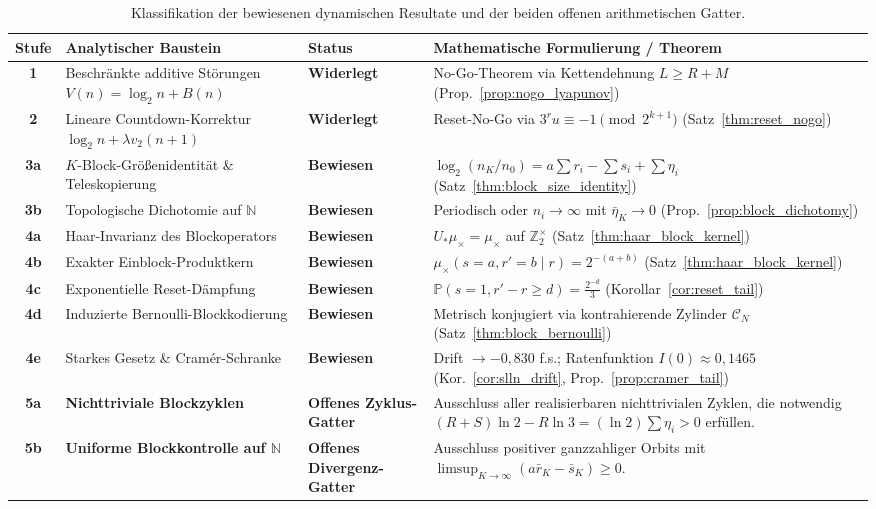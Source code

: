 \documentclass[11pt,reqno]{amsart}
\theoremstyle{definition}
\theoremstyle{remark}
\numberwithin{equation}{section}
\begin{document}
\begin{table}[!ht]
\centering
\small
\renewcommand{\arraystretch}{1.3}
\begin{tabular}{clll}
\toprule
\textbf{Stufe} & \textbf{Analytischer Baustein} & \textbf{Status} & \textbf{Mathematische Formulierung / Theorem} \\
\midrule
\textbf{1} & Beschr\"ankte additive St\"orungen $V(n) = \log_2 n + B(n)$ & \textbf{Widerlegt} & No-Go-Theorem via Kettendehnung $L \ge R+M$ (Prop.~\ref{prop:nogo_lyapunov}) \\
\textbf{2} & Lineare Countdown-Korrektur $\log_2 n + \lambda v_2(n+1)$ & \textbf{Widerlegt} & Reset-No-Go via $3^r u \equiv -1 \pmod{2^{k+1}}$ (Satz~\ref{thm:reset_nogo}) \\
\midrule
\textbf{3a} & $K$-Block-Gr\"o\ss{}enidentit\"at \& Teleskopierung & \textbf{Bewiesen} & $\log_2(n_K/n_0) = a \sum r_i - \sum s_i + \sum \eta_i$ (Satz~\ref{thm:block_size_identity}) \\
\textbf{3b} & Topologische Dichotomie auf $\mathbb{N}$ & \textbf{Bewiesen} & Periodisch oder $n_i \to \infty$ mit $\bar{\eta}_K \to 0$ (Prop.~\ref{prop:block_dichotomy}) \\
\midrule
\textbf{4a} & Haar-Invarianz des Blockoperators & \textbf{Bewiesen} & $U_* \mu_\times = \mu_\times$ auf $\mathbb{Z}_2^\times$ (Satz~\ref{thm:haar_block_kernel}) \\
\textbf{4b} & Exakter Einblock-Produktkern & \textbf{Bewiesen} & $\mu_\times(s=a, r'=b \mid r) = 2^{-(a+b)}$ (Satz~\ref{thm:haar_block_kernel}) \\
\textbf{4c} & Exponentielle Reset-D\"ampfung & \textbf{Bewiesen} & $\mathbb{P}(s=1, r'-r \ge d) = \frac{2^{-d}}{3}$ (Korollar~\ref{cor:reset_tail}) \\
\textbf{4d} & Induzierte Bernoulli-Blockkodierung & \textbf{Bewiesen} & Metrisch konjugiert via kontrahierende Zylinder $\mathcal{C}_N$ (Satz~\ref{thm:block_bernoulli}) \\
\textbf{4e} & Starkes Gesetz \& Cram\'er-Schranke & \textbf{Bewiesen} & Drift $\to -0{,}830$ f.s.; Ratenfunktion $I(0) \approx 0{,}1465$ (Kor.~\ref{cor:slln_drift}, Prop.~\ref{prop:cramer_tail}) \\
\midrule
\textbf{5a} & \textbf{Nichttriviale Blockzyklen} & \textbf{Offenes Zyklus-Gatter} & 
\parbox[t]{6.8cm}{Ausschluss aller realisierbaren nichttrivialen Zyklen, die notwendig $(R+S)\ln 2 - R\ln 3 = (\ln 2)\sum \eta_i > 0$ erf\"ullen.} \\
\textbf{5b} & \textbf{Uniforme Blockkontrolle auf $\mathbb{N}$} & \textbf{Offenes Divergenz-Gatter} & 
\parbox[t]{6.8cm}{Ausschluss positiver ganzzahliger Orbits mit $\limsup_{K \to \infty} (a \bar{r}_K - \bar{s}_K) \ge 0$.} \\
\bottomrule
\end{tabular}
\vspace{0.3em}
\caption{Klassifikation der bewiesenen dynamischen Resultate und der beiden offenen arithmetischen Gatter.}
\label{tab:final_research_ladder}
\end{table}
\end{document}
